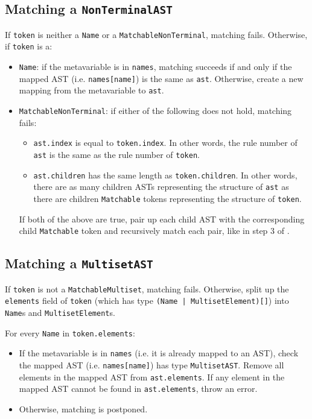 \subsection{Matching a \texorpdfstring{\lstinline{NonTerminalAST}}{NonTerminalAST}}
If \lstinline{token} is neither a \lstinline{Name} or a \lstinline{MatchableNonTerminal}, matching fails. Otherwise, if \lstinline{token} is a:
\begin{itemize}
    \item \lstinline{Name}: if the metavariable is in \lstinline{names}, matching succeeds if and only if the mapped AST (i.e. \lstinline{names[name]}) is the same as \lstinline{ast}. Otherwise, create a new mapping from the metavariable to \lstinline{ast}.
    \item \lstinline{MatchableNonTerminal}: if either of the following does not hold, matching fails:
    \begin{itemize}
        \item \lstinline{ast.index} is equal to \lstinline{token.index}. In other words, the rule number of \lstinline{ast} is the same as the rule number of \lstinline{token}.
        \item \lstinline{ast.children} has the same length as \lstinline{token.children}. In other words, there are as many children ASTs representing the structure of \lstinline{ast} as there are children \lstinline{Matchable} tokens representing the structure of \lstinline{token}.
    \end{itemize}
    If both of the above are true, pair up each child AST with the corresponding child \lstinline{Matchable} token and recursively match each pair, like in step 3 of .
\end{itemize}
\subsection{Matching a \texorpdfstring{\lstinline{MultisetAST}}{MultisetAST}}
If \lstinline{token} is not a \lstinline{MatchableMultiset}, matching fails. Otherwise, split up the \lstinline{elements} field of \lstinline{token} (which has type \lstinline{(Name | MultisetElement)[]}) into \lstinline{Name}s and \lstinline{MultisetElement}s.

For every \lstinline{Name} in \lstinline{token.elements}:
\begin{itemize}
    \item If the metavariable is in \lstinline{names} (i.e. it is already mapped to an AST), check the mapped AST (i.e. \lstinline{names[name]}) has type \lstinline{MultisetAST}. Remove all elements in the mapped AST from \lstinline{ast.elements}. If any element in the mapped AST cannot be found in \lstinline{ast.elements}, throw an error.
    \item Otherwise, matching is postponed.

\end{itemize}

